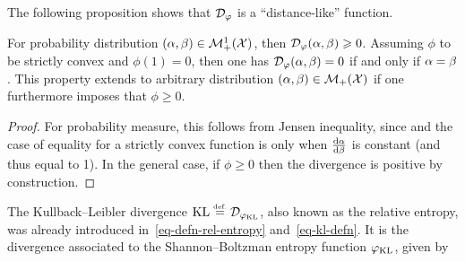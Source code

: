 The following proposition shows that $\mathcal{D}_\varphi$ is a ``distance-like'' function.

\begin{proposition}\label{phi-div-positive}
For probability distribution $(\alpha,\beta) \in \mathcal{M}_+^1(\mathcal{X})$, then $\mathcal{D}_\varphi(\alpha,\beta) \geqslant 0$. Assuming $\phi$ to be strictly convex and $\phi(1)=0$, then one has $\mathcal{D}_\varphi(\alpha,\beta)=0$ if and only if $\alpha=\beta$.
%
This property extends to arbitrary distribution $(\alpha,\beta) \in \mathcal{M}_+(\mathcal{X})$ if one furthermore imposes that $\phi \geq 0$. 
\end{proposition}

\begin{proof} 
	For probability measure, this follows from Jensen inequality, since
	and the case of equality for a strictly convex function is only when $\frac{\mathrm{d}\alpha}{\mathrm{d}\beta}$ is constant (and thus equal to 1).
	In the general case, if $\phi \geq 0$ then the divergence is positive by construction. 
\end{proof} 

\begin{example}
\label{ex_KLdiv}
The Kullback--Leibler divergence $\operatorname{KL} \stackrel{\mbox{\upshape\tiny def.}}{=} \mathcal{D}_{\varphi_{\operatorname{KL}}}$, also known as the relative entropy, was already introduced in~\eqref{eq-defn-rel-entropy} and~\eqref{eq-kl-defn}. It is the divergence associated to the Shannon--Boltzman entropy function $\varphi_{\operatorname{KL}}$, given by
\end{example}


